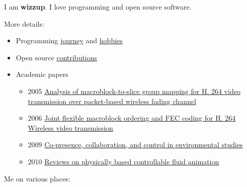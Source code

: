\documentclass{article}
\begin{document}
%
%
%

I am \textbf{wizzup}. I love programming and open source software.

More details:

\begin{itemize}
  \item Programming \href{/me/programming}{journey} and \href{/me/hobbies}{hobbies}
  \item Open source \href{/contribution}{contributions}
  \item Academic papers
  \begin{itemize}
    \item 2005 \href{https://doi.org/10.1109/MWSCAS.2005.1594408}{Analysis of macroblock-to-slice group mapping for H. 264 video transmission over packet-based wireless fading channel}
    \item 2006 \href{https://doi.org/10.1109/ISPACS.2006.364853}{Joint flexible macroblock ordering and FEC coding for H. 264 Wireless video transmission}
    \item 2009 \href{https://doi.org/10.1007/s10055-009-0130-5}{Co-presence, collaboration, and control in environmental studies}
    \item 2010 \href{https://doi.org/10.4186/ej.2010.14.2.41}{Reviews on physically based controllable fluid animation}
  \end{itemize}
\end{itemize}

Me on various places:
\end{document}

